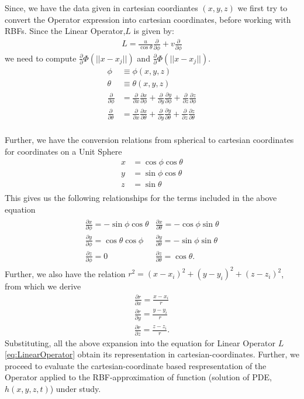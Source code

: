 \documentclass[11pt]{article}
\begin{document}
Since, we have the data given in cartesian coordiantes $(x,y,z)$ we first try to convert the Operator expression into cartesian coordinates, before working with RBFs. Since the Linear Operator,$L$ is given by:
\begin{align}
L = \frac{u}{\cos\theta} \frac{\partial}{\partial \phi} + v \frac{\partial}{\partial\phi} \label{eq:LinearOperator}
\end{align}
we need to compute  $\frac{\partial}{\partial}\Phi(||x - x_j||)$ and $\frac{\partial}{\partial}\Phi(||x - x_j||)$.
\begin{align*}
\phi &\equiv \phi(x,y,z) \\
\theta &\equiv \theta(x,y,z)\\
\frac{\partial}{\partial\phi} &= \frac{\partial}{\partial x}\frac{\partial x}{\partial \phi} + \frac{\partial}{\partial y} \frac{\partial y}{\partial \phi} + \frac{\partial}{\partial z} \frac{\partial z}{\partial \phi} \\
\frac{\partial}{\partial\theta} &= \frac{\partial}{\partial x}\frac{\partial x}{\partial \theta} + \frac{\partial}{\partial y} \frac{\partial y}{\partial \theta} + \frac{\partial}{\partial z} \frac{\partial z}{\partial \theta} \\
\end{align*}

Further, we have the conversion relations from spherical to cartesian coordinates for coordinates on a Unit Sphere
\begin{align*}
x &= \cos\phi\cos\theta \\
y &= \sin\phi \cos\theta \\
z &= \sin\theta \\
\end{align*}
This gives us the following relationships for the terms included in the above equation
\begin{align*}
\begin{array}{cc}
\frac{\partial x}{\partial \phi} = -\sin\phi \cos\theta & \frac{\partial x}{\partial \theta} = -\cos\phi\sin\theta\\
\frac{\partial y}{\partial \phi} = \cos\theta \cos\phi& \frac{\partial y}{\partial \theta} = -\sin\phi \sin\theta\\
\frac{\partial z}{\partial \phi}= 0 & \frac{\partial z}{\partial \theta} = \cos\theta.
\end{array}
\end{align*}
Further, we also have the relation $r^2 = (x - x_i)^2 + (y - y_i)^2 + (z- z_i)^2$, from which we derive 
\begin{align*}
\frac{\partial r}{\partial x} = \frac{x - x_i}{r}\\
\frac{\partial r}{\partial y} = \frac{y - y_i}{r}\\
\frac{\partial r}{\partial z} = \frac{z - z_i}{r}.
\end{align*}
Substituting, all the above expansion into the equation for Linear Operator $L$ \eqref{eq:LinearOperator} obtain its
representation in cartesian-coordinates. Further, we proceed to evaluate the cartesian-coordinate based respresentation of the Operator applied to the RBF-approximation of function (solution of PDE, $h(x,y,z,t)$) under study.
\end{document}
